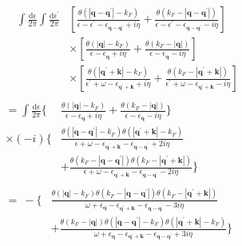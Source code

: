 \[ \begin{split}
&\quad \begin{split} \int \frac{\mathrm{d}\epsilon}{2\pi}\int \frac{\mathrm{d}\epsilon^{'}}{2\pi}
& \left[ \frac{\theta(|\mathbf{q}-\mathbf{q}^{'}|-k_F)}{\epsilon - \epsilon^{'}-\epsilon_{\mathbf{q}-\mathbf{q}^{'}}+i\eta} + \frac{\theta(k_F-|\mathbf{q}-\mathbf{q}^{'}|)}{\epsilon - \epsilon^{'}-\epsilon_{\mathbf{q}-\mathbf{q}^{'}}-i\eta} \right] \\
& \times \left[ \frac{\theta(|\mathbf{q}|-k_F)}{\epsilon -\epsilon_{\mathbf{q}}+i\eta} + \frac{\theta(k_F-|\mathbf{q}|)}{\epsilon -\epsilon_{\mathbf{q}}-i\eta} \right] \\
& \times \left[ \frac{\theta(|\mathbf{q}^{'}+\mathbf{k}|-k_F)}{\epsilon^{'}+\omega -\epsilon_{\mathbf{q}^{'}+\mathbf{k}}+i\eta} + \frac{\theta(k_F-|\mathbf{q}^{'}+\mathbf{k}|)}{\epsilon^{'}+\omega -\epsilon_{\mathbf{q}^{'}+\mathbf{k}}-i\eta} \right]
\end{split}
\\
& \begin{split}=
\int \frac{\mathrm{d}\epsilon}{2\pi} \{ & \frac{\theta(|\mathbf{q}|-k_F)}{\epsilon -\epsilon_{\mathbf{q}}+i\eta} + \frac{\theta(k_F-|\mathbf{q}|)}{\epsilon -\epsilon_{\mathbf{q}}-i\eta} \} \\
\times(-i)\{ & \frac{\theta(|\mathbf{q}-\mathbf{q}^{'}|-k_F)\theta(|\mathbf{q}^{'}+\mathbf{k}|-k_F)}{\epsilon + \omega - \epsilon_{\mathbf{q}^{'}+\mathbf{k}} - \epsilon_{\mathbf{q}-\mathbf{q}^{'}} + 2 i \eta }\\
&+\frac{\theta(k_F-|\mathbf{q}-\mathbf{q}^{'}|)\theta(k_F-|\mathbf{q}^{'}+\mathbf{k}|)}{\epsilon + \omega - \epsilon_{\mathbf{q}^{'}+\mathbf{k}} - \epsilon_{\mathbf{q}-\mathbf{q}^{'}} - 2 i \eta }
\}
\end{split}\\
& \begin{split}=  \ - \{&
\frac{\theta(|\mathbf{q}|-k_F)\theta(k_F-|\mathbf{q}-\mathbf{q}^{'}|)\theta(k_F-|\mathbf{q}^{'}+\mathbf{k}|)}{\omega+\epsilon_{\mathbf{q}} - \epsilon_{\mathbf{q}^{'}+\mathbf{k}}-\epsilon_{\mathbf{q}-\mathbf{q}^{'}}-3i \eta}\\
&+\frac{\theta(k_F-|\mathbf{q}|)\theta(|\mathbf{q}-\mathbf{q}^{'}|-k_F)\theta(|\mathbf{q}^{'}+\mathbf{k}|-k_F)}{\omega+\epsilon_{\mathbf{q}} - \epsilon_{\mathbf{q}^{'}+\mathbf{k}}-\epsilon_{\mathbf{q}-\mathbf{q}^{'}}+3i \eta} \} \end{split}
\end{split} \]

